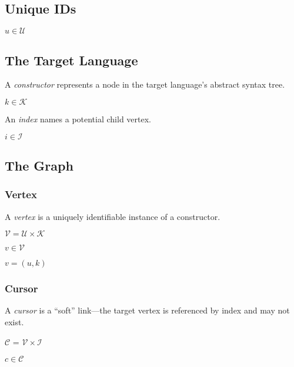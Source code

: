 \documentclass[letterpaper,12pt]{article}
\def\C{\mathcal{C}}
\def\I{\mathcal{I}}
\def\K{\mathcal{K}}
\def\U{\mathcal{U}}
\def\V{\mathcal{V}}
\begin{document}
\subsection{Unique IDs}
\label{sec:unique-ids}

$u \in \U$


\subsection{The Target Language}
\label{sec:the-target-language}

A \emph{constructor} represents a node in the target language's abstract
syntax tree.

$k \in \K$

An \emph{index} names a potential child vertex.

$i \in \I$


\subsection{The Graph}
\label{sec:the-graph}


\subsubsection{Vertex}
\label{sec:vertex}

A \emph{vertex} is a uniquely identifiable instance of a constructor.

$\V = \U \times \K$

$v \in \V$

$v = (u, k)$


\subsubsection{Cursor}
\label{sec:cursor}

A \emph{cursor} is a ``soft'' link---the target vertex is referenced by index
and may not exist.

$\C$ = $\V \times \I$

$c \in \C$
\end{document}
